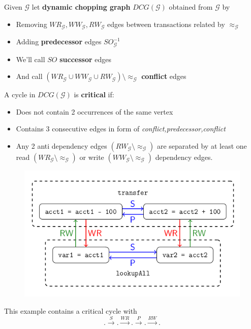 \documentclass{beamer}
\begin{document}
\begin{frame}
	Given $\mathcal{G}$ let \textbf{dynamic chopping graph} $DCG(\mathcal{G})$ obtained from $\mathcal{G}$ by
	\begin{itemize}
		\item Removing $WR_\mathcal{G}, WW_\mathcal{G}, RW_\mathcal{G}$ edges between transactions related by $\approx_\mathcal{G}$
		\item Adding \textbf{predecessor} edges $SO^{-1}_\mathcal{G}$
		\item We'll call $SO$ \textbf{successor} edges
		\item And  call $\left( WR_\mathcal{G} \cup WW_\mathcal{G} \cup RW_\mathcal{G} \right) \setminus \approx_\mathcal{G}$ \textbf{conflict} edges
	\end{itemize}
\end{frame}

\begin{frame}
A cycle in $DCG(\mathcal{G})$ is \textbf{critical} if:
\begin{itemize}
	\item Does not contain 2 occurrences of the same vertex
	\item Contains 3 consecutive edges in form of \textit{conflict,predecessor,conflict}
	\item Any 2 anti dependency edges $(RW_\mathcal{G}\setminus \approx_\mathcal{G})$ are separated by at least one read $(WR_\mathcal{G}\setminus \approx_\mathcal{G})$ or write $(WW_\mathcal{G}\setminus \approx_\mathcal{G})$ dependency edges.
\end{itemize}
\end{frame}


\begin{frame}
\begin{figure}
	\includegraphics[scale=0.35]{fig5a}
\end{figure}
This example contains a critical cycle with $$.\xrightarrow{S}.\xrightarrow{WR}.\xrightarrow{P}.\xrightarrow{RW}.$$
\end{frame}
\end{document}
